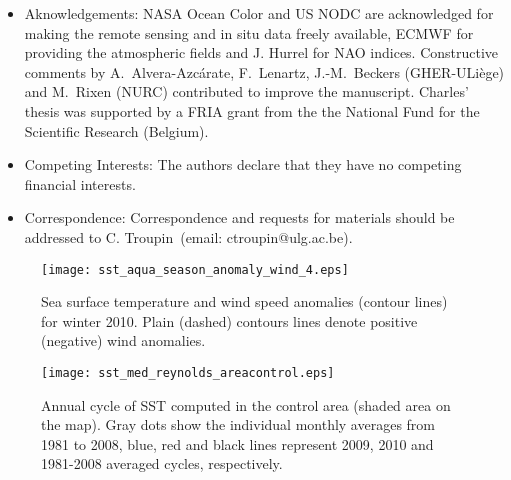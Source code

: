 \documentclass[12pt]{article}
\begin{document}





\begin{itemize}
 \item Aknowledgements: NASA Ocean Color and US NODC are acknowledged for making the remote sensing and in situ data freely available, ECMWF for providing the atmospheric fields and J. Hurrel for NAO indices. Constructive comments by A.~Alvera-Azc\'{a}rate, F.~Lenartz, J.-M.~Beckers (GHER-ULiège) and M.~Rixen (NURC) contributed to improve the manuscript. Charles' thesis was supported by a FRIA grant from the the National Fund for the Scientific Research (Belgium).
 
 \item Competing Interests: The authors declare that they have no
competing financial interests.

 \item Correspondence: Correspondence and requests for materials
should be addressed to C. Troupin~(email: ctroupin@ulg.ac.be).

\end{itemize}


\begin{figure}[H]
\centering
\texttt{[image: sst\_aqua\_season\_anomaly\_wind\_4.eps]}
\caption{Sea surface temperature and wind speed anomalies (contour lines) for winter 2010. Plain (dashed) contours lines denote positive (negative) wind anomalies.\label{fig:sst_aqua_season_anomaly_wind_4}}
\end{figure}

\begin{figure}[H]
\centering
\texttt{[image: sst\_med\_reynolds\_areacontrol.eps]}
\caption{Annual cycle of SST computed in the control area (shaded area on the map). Gray dots show the individual monthly averages from 1981 to 2008, blue, red and black lines represent 2009, 2010 and 1981-2008 averaged cycles, respectively.\label{fig:sst_med_reynolds_areacontrol}}
\end{figure}
\end{document}
